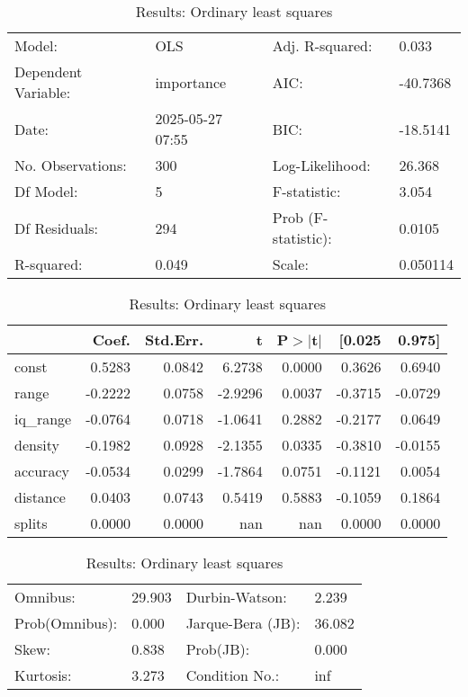 \begin{table}
\caption{Results: Ordinary least squares}
\label{}
\begin{center}
\begin{tabular}{llll}
\hline
Model:              & OLS              & Adj. R-squared:     & 0.033     \\
Dependent Variable: & importance       & AIC:                & -40.7368  \\
Date:               & 2025-05-27 07:55 & BIC:                & -18.5141  \\
No. Observations:   & 300              & Log-Likelihood:     & 26.368    \\
Df Model:           & 5                & F-statistic:        & 3.054     \\
Df Residuals:       & 294              & Prob (F-statistic): & 0.0105    \\
R-squared:          & 0.049            & Scale:              & 0.050114  \\
\hline
\end{tabular}
\end{center}

\begin{center}
\begin{tabular}{lrrrrrr}
\hline
          &   Coef. & Std.Err. &       t & P$> |$t$|$ &  [0.025 &  0.975]  \\
\hline
const     &  0.5283 &   0.0842 &  6.2738 &      0.0000 &  0.3626 &  0.6940  \\
range     & -0.2222 &   0.0758 & -2.9296 &      0.0037 & -0.3715 & -0.0729  \\
iq\_range & -0.0764 &   0.0718 & -1.0641 &      0.2882 & -0.2177 &  0.0649  \\
density   & -0.1982 &   0.0928 & -2.1355 &      0.0335 & -0.3810 & -0.0155  \\
accuracy  & -0.0534 &   0.0299 & -1.7864 &      0.0751 & -0.1121 &  0.0054  \\
distance  &  0.0403 &   0.0743 &  0.5419 &      0.5883 & -0.1059 &  0.1864  \\
splits    &  0.0000 &   0.0000 &     nan &         nan &  0.0000 &  0.0000  \\
\hline
\end{tabular}
\end{center}

\begin{center}
\begin{tabular}{llll}
\hline
Omnibus:       & 29.903 & Durbin-Watson:    & 2.239   \\
Prob(Omnibus): & 0.000  & Jarque-Bera (JB): & 36.082  \\
Skew:          & 0.838  & Prob(JB):         & 0.000   \\
Kurtosis:      & 3.273  & Condition No.:    & inf     \\
\hline
\end{tabular}
\end{center}
\end{table}
